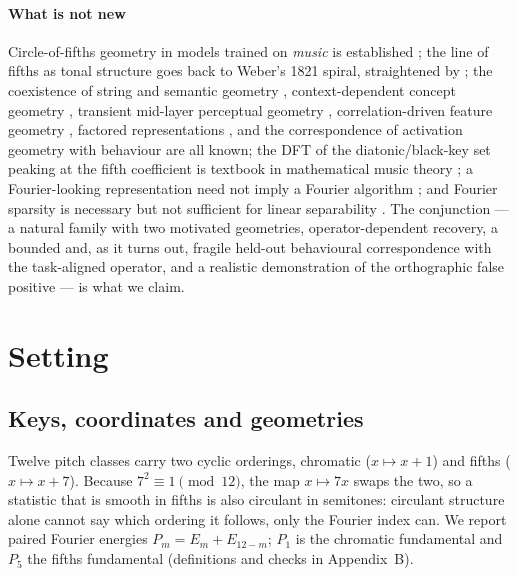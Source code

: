 \documentclass[11pt]{article}
\begin{document}
\paragraph{What is not new} Circle-of-fifths geometry in models trained on \emph{music} is established \citep{chuan2020context,huang2016chordripple,sadek2026circle}; the line of fifths as tonal structure goes back to Weber's 1821 spiral, straightened by \citet{temperley2000line}; the coexistence of string and semantic geometry \citep{marjieh2025number}, context-dependent concept geometry \citep{hu2026shared}, transient mid-layer perceptual geometry \citep{singh2026geometry}, correlation-driven feature geometry \citep{prieto2026data}, factored representations \citep{shai2026factored}, and the correspondence of activation geometry with behaviour \citep{wurgaft2026manifold} are all known; the DFT of the diatonic/black-key set peaking at the fifth coefficient is textbook in mathematical music theory \citep{quinn2006general,amiot2016music}; a Fourier-looking representation need not imply a Fourier algorithm \citep{nanda2023progress,zhong2023clock,feucht2026arithmetic}; and Fourier sparsity is necessary but not sufficient for linear separability \citep{fu2026convergent}. The conjunction --- a natural family with two motivated geometries, operator-dependent recovery, a bounded and, as it turns out, fragile held-out behavioural correspondence with the task-aligned operator, and a realistic demonstration of the orthographic false positive --- is what we claim.

\section{Setting}\label{sec:setup}

\subsection{Keys, coordinates and geometries}
Twelve pitch classes carry two cyclic orderings, chromatic ($x\mapsto x+1$) and fifths ($x\mapsto x+7$). Because $7^2\equiv1\pmod{12}$, the map $x\mapsto7x$ swaps the two, so a statistic that is smooth in fifths is also circulant in semitones: circulant structure alone cannot say which ordering it follows, only the Fourier index can. We report paired Fourier energies $P_m=E_m+E_{12-m}$; $P_1$ is the chromatic fundamental and $P_5$ the fifths fundamental (definitions and checks in Appendix~B).
\end{document}
